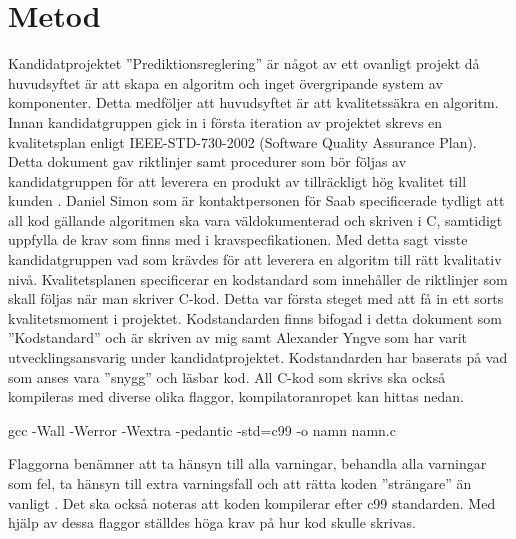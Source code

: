 \section{Metod}
Kandidatprojektet ''Prediktionsreglering'' är något av ett ovanligt projekt då huvudsyftet är att skapa en algoritm och inget övergripande system av komponenter. Detta medföljer att huvudsyftet är att kvalitetssäkra en algoritm.
\newline
\newline
Innan kandidatgruppen gick in i första iteration av projektet skrevs en kvalitetsplan enligt IEEE-STD-730-2002 (Software Quality Assurance Plan). Detta dokument gav riktlinjer samt procedurer som bör följas av kandidatgruppen för att leverera en produkt av tillräckligt hög kvalitet till kunden \citep{SQAP}. Daniel Simon som är kontaktpersonen för Saab specificerade tydligt att all kod gällande algoritmen ska vara väldokumenterad och skriven i C, samtidigt uppfylla de krav som finns med i kravspecfikationen. Med detta sagt visste kandidatgruppen vad som krävdes för att leverera en algoritm till rätt kvalitativ nivå. Kvalitetsplanen specificerar en kodstandard som innehåller de riktlinjer som skall följas när man skriver C-kod. Detta var första steget med att få in ett sorts kvalitetsmoment i projektet. Kodstandarden finns bifogad i detta dokument som ''Kodstandard'' och är skriven av mig samt Alexander Yngve som har varit utvecklingsansvarig under kandidatprojektet. Kodstandarden har baserats på vad som anses vara ''snygg'' och läsbar kod. All C-kod som skrivs ska också kompileras med diverse olika flaggor, kompilatoranropet kan hittas nedan.
\begin{tcolorbox}[boxrule=1pt,leftrule=5pt,arc=0pt,auto outer arc]
gcc -Wall -Werror -Wextra -pedantic -std=c99 -o namn namn.c
\end{tcolorbox}
\noindent Flaggorna benämner att ta hänsyn till alla varningar, behandla alla varningar som fel, ta hänsyn till extra varningsfall och att rätta koden ''strängare'' än vanligt \citep{gccflags}. Det ska också noteras att koden kompilerar efter c99 standarden. Med hjälp av dessa flaggor ställdes höga krav på hur kod skulle skrivas. 
\newline
\newline
